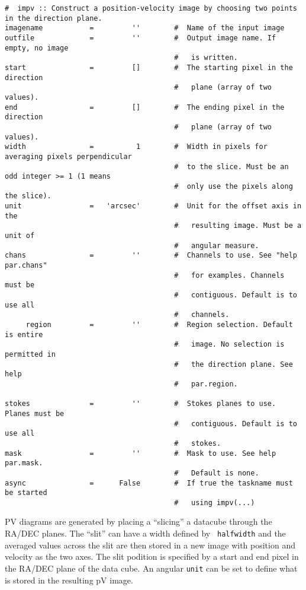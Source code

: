 \small
\begin{verbatim}
#  impv :: Construct a position-velocity image by choosing two points in the direction plane.
imagename           =         ''        #  Name of the input image
outfile             =         ''        #  Output image name. If empty, no image
                                        #   is written.
start               =         []        #  The starting pixel in the direction
                                        #   plane (array of two values).
end                 =         []        #  The ending pixel in the direction
                                        #   plane (array of two values).
width               =          1        #  Width in pixels for averaging pixels perpendicular 
                                        #  to the slice. Must be an odd integer >= 1 (1 means 
                                        #  only use the pixels along the slice).
unit                =   'arcsec'        #  Unit for the offset axis in the
                                        #   resulting image. Must be a unit of
                                        #   angular measure.
chans               =         ''        #  Channels to use. See "help par.chans"
                                        #   for examples. Channels must be
                                        #   contiguous. Default is to use all
                                        #   channels.
     region         =         ''        #  Region selection. Default is entire
                                        #   image. No selection is permitted in
                                        #   the direction plane. See help
                                        #   par.region.

stokes              =         ''        #  Stokes planes to use. Planes must be
                                        #   contiguous. Default is to use all
                                        #   stokes.
mask                =         ''        #  Mask to use. See help par.mask.
                                        #   Default is none.
async               =      False        #  If true the taskname must be started
                                        #   using impv(...)
\end{verbatim}
\normalsize

PV diagrams are generated by placing a ``slicing'' a datacube through
the RA/DEC planes. The ``slit'' can have a width defined by {\tt
  halfwidth} and the averaged values across the slit are then stored
in a new image with position and velocity as the two axes. The slit
podition is specified by a start and end pixel in the RA/DEC
plane of the data cube. An angular {\tt unit} can be set to define
what is stored in the resulting pV image.



